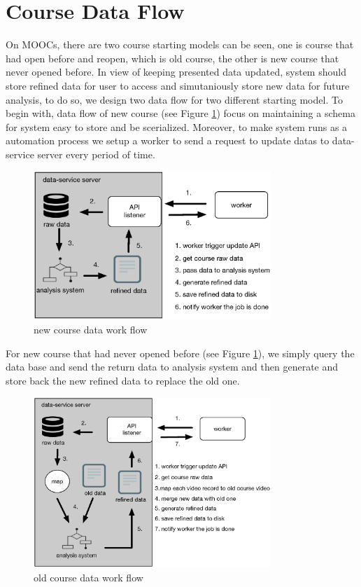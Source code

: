 \section{Course Data Flow}
On MOOCs, there are two course starting models can be seen, one is course that had open before and reopen, which is old course, the other is new course that never opened before.
In view of keeping presented data updated, system should store refined data for user to access and simutaniously store new data for future analysis, to do so, we design two data flow for two different starting model.
To begin with, data flow of new course (see Figure \ref{fig:new-course-flow}) focus on maintaining a schema for system easy to store and be scerialized.
Moreover, to make system runs as a automation process we setup a worker to send a request to update datas to data-service server every period of time.

\begin{figure}[H]
    \centering
    \includegraphics[width = 0.8\textwidth]{fig/new-class-workflow.eps}
    \caption{new course data work flow}
    \label{fig:new-course-flow}
\end{figure}

For new course that had never opened before (see Figure \ref{fig:new-course-flow}), we simply query the data base and send the return data to analysis system and then generate and store back the new refined data to replace the old one.

\begin{figure}[H]
    \centering
    \includegraphics[width = 0.8\textwidth]{fig/old-course-flow.eps}
    \caption{old course data work flow}
    \label{fig:old-course-flow}
\end{figure}

